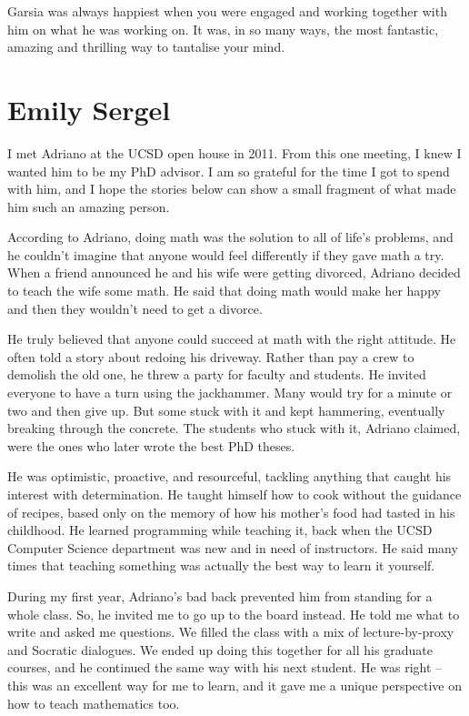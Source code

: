 \documentclass{notices}
\begin{document}
Garsia was always happiest when you were engaged and working together with him on what he was working on.
It was, in so many ways, the most fantastic, amazing and thrilling way to tantalise your mind.

\section*{Emily Sergel}
I met Adriano at the UCSD open house in 2011. From this one meeting, I knew I wanted him to be my PhD advisor. I am so grateful for the time I got to spend with him, and I hope the stories below can show a small fragment of what made him such an amazing person.

According to Adriano, doing math was the solution to all of life's problems, and he couldn't imagine that anyone would feel differently if they gave math a try. When a friend announced he and his wife were getting divorced, Adriano decided to teach the wife some math. He said that doing math would make her happy and then they wouldn't need to get a divorce.

He truly believed that anyone could succeed at math with the right attitude. He often told a story about redoing his driveway. Rather than pay a crew to demolish the old one, he threw a party for faculty and students. He invited everyone to have a turn using the jackhammer. Many would try for a minute or two and then give up. But some stuck with it and kept hammering, eventually breaking through the concrete. The students who stuck with it, Adriano claimed, were the ones who later wrote the best PhD theses.

He was optimistic, proactive, and resourceful, tackling anything that caught his interest with determination. He taught himself how to cook without the guidance of recipes, based only on the memory of how his mother's food had tasted in his childhood. He learned programming while teaching it, back when the UCSD Computer Science department was new and in need of instructors. He said many times that teaching something was actually the best way to learn it yourself.

During my first year, Adriano's bad back prevented him from standing for a whole class. So, he invited me to go up to the board instead. He told me what to write and asked me questions. We filled the class with a mix of lecture-by-proxy and Socratic dialogues. We ended up doing this together for all his graduate courses, and he continued the same way with his next student. He was right – this was an excellent way for me to learn, and it gave me a unique perspective on how to teach mathematics too.
\end{document}
